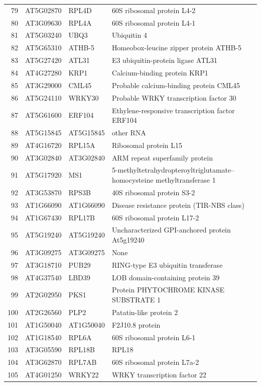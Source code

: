\documentclass[11pt]{article}
\begin{document}
\begin{center}
\begin{tabular}{rlll}
79 & AT5G02870 & RPL4D & 60S ribosomal protein L4-2\\
80 & AT3G09630 & RPL4A & 60S ribosomal protein L4-1\\
81 & AT5G03240 & UBQ3 & Ubiquitin 4\\
82 & AT5G65310 & ATHB-5 & Homeobox-leucine zipper protein ATHB-5\\
83 & AT5G27420 & ATL31 & E3 ubiquitin-protein ligase ATL31\\
84 & AT4G27280 & KRP1 & Calcium-binding protein KRP1\\
85 & AT3G29000 & CML45 & Probable calcium-binding protein CML45\\
86 & AT5G24110 & WRKY30 & Probable WRKY transcription factor 30\\
87 & AT5G61600 & ERF104 & Ethylene-responsive transcription factor ERF104\\
88 & AT5G15845 & AT5G15845 & other RNA\\
89 & AT4G16720 & RPL15A & Ribosomal protein L15\\
90 & AT3G02840 & AT3G02840 & ARM repeat superfamily protein\\
91 & AT5G17920 & MS1 & 5-methyltetrahydropteroyltriglutamate--homocysteine methyltransferase 1\\
92 & AT3G53870 & RPS3B & 40S ribosomal protein S3-2\\
93 & AT1G66090 & AT1G66090 & Disease resistance protein (TIR-NBS class)\\
94 & AT1G67430 & RPL17B & 60S ribosomal protein L17-2\\
95 & AT5G19240 & AT5G19240 & Uncharacterized GPI-anchored protein At5g19240\\
96 & AT3G09275 & AT3G09275 & None\\
97 & AT3G18710 & PUB29 & RING-type E3 ubiquitin transferase\\
98 & AT4G37540 & LBD39 & LOB domain-containing protein 39\\
99 & AT2G02950 & PKS1 & Protein PHYTOCHROME KINASE SUBSTRATE 1\\
100 & AT2G26560 & PLP2 & Patatin-like protein 2\\
101 & AT1G50040 & AT1G50040 & F2J10.8 protein\\
102 & AT1G18540 & RPL6A & 60S ribosomal protein L6-1\\
103 & AT3G05590 & RPL18B & RPL18\\
104 & AT3G62870 & RPL7AB & 60S ribosomal protein L7a-2\\
105 & AT4G01250 & WRKY22 & WRKY transcription factor 22\\

\end{tabular}
\end{center}
\end{document}
